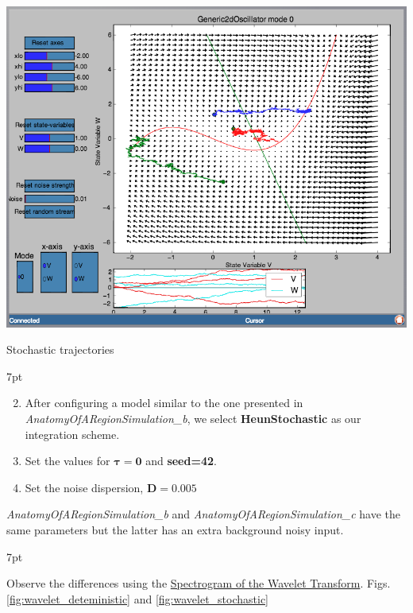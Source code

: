 \documentclass{tufte-handout}
\newenvironment{formal}{%
  \def\FrameCommand{%
    \hspace{1pt}%
    {\color{DarkBlue}\vrule width 2pt}%
    {\color{formalshade}\vrule width 4pt}%
    \colorbox{formalshade}%
  }%
  \MakeFramed{\advance\hsize-\width\FrameRestore}%
  \noindent\hspace{-4.55pt}%
  \begin{adjustwidth}{}{7pt}%
  \vspace{2pt}\vspace{2pt}%
}
{%
  \vspace{2pt}\end{adjustwidth}\endMakeFramed%
}
\newenvironment{simulation}{%
  \def\FrameCommand{%
    \hspace{1pt}%
    {\color{ForestGreen}\vrule width 2pt}%
    {\color{simulationshade}\vrule width 4pt}%
    \colorbox{simulationshade}%
  }%
  \MakeFramed{\advance\hsize-\width\FrameRestore}%
  \noindent\hspace{-4.55pt}%
  \begin{adjustwidth}{}{7pt}%
  \vspace{2pt}\vspace{2pt}%
}
{%
  \vspace{2pt}\end{adjustwidth}\endMakeFramed%
}
\begin{document}
\begin{marginfigure}%
\includegraphics[width=\linewidth]{Handout_UI_BuildingYourOwnBrainNetworkModel_PPI}%
  \caption{Stochastic trajectories}%
  \label{fig:ppi_noise}%
\end{marginfigure}

\begin{simulation}
\begin{enumerate}[resume]
\setcounter{enumi}{1}
\item After configuring a model similar to the one presented in  \textit{AnatomyOfARegionSimulation\_b}, we select \textbf{HeunStochastic} as our integration scheme.  
\item Set the values for {$\mathbf{\tau=0}$}  and \textbf{seed=42}. 
\item Set the noise dispersion, $\mathbf{D=0.005}$
\end{enumerate}
\end{simulation}
\newpage
\textit{AnatomyOfARegionSimulation\_b} and \textit{AnatomyOfARegionSimulation\_c} have the same parameters but the latter has an extra background noisy input. 

\begin{formal}
\begin{enumerate}
Observe the differences using the \underline{Spectrogram of the Wavelet Transform}. Figs. \ref{fig:wavelet_deteministic} and \ref{fig:wavelet_stochastic}
\end{enumerate}
\end{formal}
\end{document}
